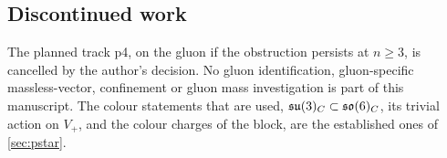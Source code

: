 \subsection{Discontinued work}

The planned track p4, on the gluon if the obstruction persists at $n\ge3$, is cancelled by the author's decision. No gluon identification, gluon-specific
massless-vector, confinement or gluon mass investigation is part of this manuscript. The colour statements that are used, $\mathfrak{su}(3)_C\subset\mathfrak{so}(6)_C$, its trivial
action on $V_+$, and the colour charges of the block, are the established ones of \cref{sec:pstar}.

